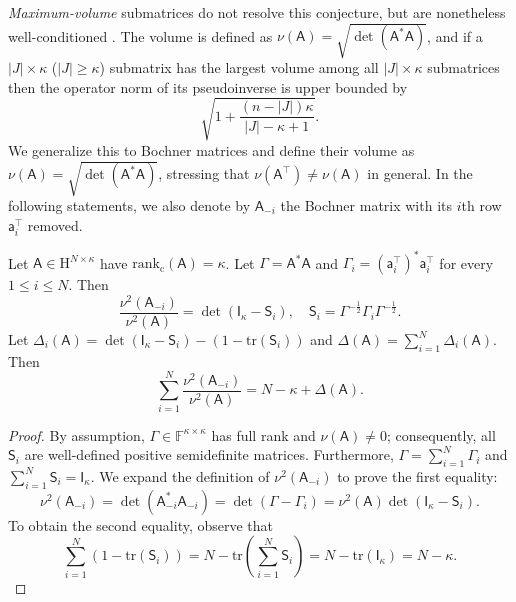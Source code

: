 \documentclass[onefignum,onetabnum]{siamart250211}
\renewenvironment{equation*}{\[}{\]\ignorespacesafterend}
\newcommand{\F}{\mathbb{F}}
\newcommand{\Hilb}{\mathrm{H}}
\newcommand{\Batrix}[1]{\bm{\Matrix{#1}}}
\newcommand{\Matrix}[1]{\mathsf{#1}}
\newcommand{\trans}{\intercal}
\newcommand{\trace}{\mathrm{tr}}
\newcommand{\Rank}[3][]{\mathrm{rank_{#2}} #1( #3 #1)}
\newcommand{\Index}[1]{{#1}}
\begin{document}
\emph{Maximum-volume} submatrices do not resolve this conjecture, but are nonetheless well-conditioned \cite{goreinov1997theory, de2007subset, mikhalev2018rectangular, osinsky2018pseudo}.
The volume is defined as $\nu(\Matrix{A}) = \sqrt{\det(\Matrix{A}^\ast \Matrix{A})}$, and if a $|\Index{J}| \times \kappa$ ($|\Index{J}| \geq \kappa$) submatrix has the largest volume among all $|\Index{J}| \times \kappa$ submatrices then the operator norm of its pseudoinverse is upper bounded by
\begin{equation}
\label{eq:maxvol_classical}
    \sqrt{1 + \frac{(n - |\Index{J}|)\kappa}{|\Index{J}| - \kappa + 1}}.   
\end{equation}
We generalize this to Bochner matrices and define their volume as $\nu(\Batrix{A}) = \sqrt{\det(\Batrix{A}^\ast \Batrix{A})}$, stressing that $\nu(\Batrix{A}^\trans) \neq \nu(\Batrix{A})$ in general. 
In the following statements, we also denote by $\Batrix{A}_{-i}$ the Bochner matrix with its $i$th row $\Batrix{a}_i^\trans$ removed.

\begin{lemma}
\label{lemma:rank_excess}
Let $\Batrix{A} \in \Hilb^{N \times \kappa}$ have $\Rank{c}{\Batrix{A}} = \kappa$.
Let $\Matrix{\Gamma} = \Batrix{A}^\ast \Batrix{A}$ and $\Matrix{\Gamma}_i = (\Batrix{a}_{i}^\trans)^\ast \Batrix{a}_{i}^\trans$ for every $1 \leq i \leq N$.
Then
\begin{equation*}
    \frac{\nu^2(\Batrix{A}_{-i})}{\nu^2(\Batrix{A})} = \det(\Matrix{I}_{\kappa} - \Matrix{S}_i), \quad \Matrix{S}_i = \Matrix{\Gamma}^{-\tfrac{1}{2}} \Matrix{\Gamma}_i \Matrix{\Gamma}^{-\tfrac{1}{2}}.
\end{equation*}
Let $\Delta_{i}(\Batrix{A}) = \det(\Matrix{I}_{\kappa} - \Matrix{S}_i) - (1 - \trace(\Matrix{S}_i))$ and $\Delta(\Batrix{A}) = \sum_{i = 1}^{N} \Delta_{i}(\Batrix{A})$.
Then
\begin{equation*}
    \sum_{i = 1}^{N} \frac{\nu^2(\Batrix{A}_{-i})}{\nu^2(\Batrix{A})} = N - \kappa + \Delta(\Batrix{A}).
\end{equation*}
\end{lemma}
\begin{proof}
By assumption, $\Matrix{\Gamma} \in \F^{\kappa \times \kappa}$ has full rank and $\nu(\Batrix{A}) \neq 0$; consequently, all $\Matrix{S}_i$ are well-defined positive semidefinite matrices.
Furthermore, $\Matrix{\Gamma} = \sum_{i = 1}^{N} \Matrix{\Gamma}_i$ and $\sum_{i = 1}^{N} \Matrix{S}_i = \Matrix{I}_{\kappa}$.
We expand the definition of $\nu^2(\Batrix{A}_{-i})$ to prove the first equality:
\begin{equation*}
    \nu^2(\Batrix{A}_{-i}) = \det(\Batrix{A}_{-i}^\ast \Batrix{A}_{-i}) = \det(\Matrix{\Gamma} - \Matrix{\Gamma}_i) = \nu^2(\Batrix{A}) \det(\Matrix{I}_{\kappa} - \Matrix{S}_i).
\end{equation*}
To obtain the second equality, observe that
\begin{equation*}
    \sum_{i = 1}^{N} (1 - \trace(\Matrix{S}_i)) = N - \trace\left(\sum_{i = 1}^N \Matrix{S}_i\right) = N - \trace(\Matrix{I}_{\kappa}) = N - \kappa.
\end{equation*}
\end{proof}
\end{document}
